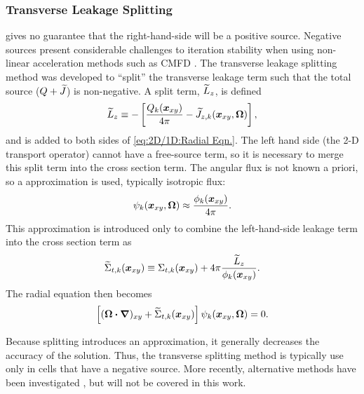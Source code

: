 {{{      \subsubsection{Transverse Leakage Splitting}{\label{sssec:3T:Transverse Leakage Splitting}
         gives no guarantee that the right-hand-side will be a positive source.
        Negative sources present considerable challenges to iteration stability when using non-linear acceleration methods such as \ac{CMFD} \cite{Jarrett2018}.
        The transverse leakage splitting method \cite{Stimpson2015,Kelley2015} was developed to ``split'' the transverse leakage term such that the total source ($Q+\widetilde{J}$) is non-negative.
        A split term, $\widetilde{L}_{z}$, is defined
        \begin{equation}\label{eq:2D/1D:Split Term}
          \widetilde{L}_z \equiv -\left[\frac{Q_k(\boldsymbol{x}_{xy})}{4\pi} - \widetilde{J}_{z,k}(\boldsymbol{x}_{xy},\boldsymbol{\Omega})\right],
        \end{equation}
        and is added to both sides of \cref{eq:2D/1D:Radial Eqn.}.
        The left hand side (the 2-D transport operator) cannot have a free-source term, so it is necessary to merge this split term into the cross section term.
        The angular flux is not known a priori, so a approximation is used, typically isotropic flux:
        \begin{equation}\label{eq:2D/1D:Isotropic Flux}
          \psi_k(\boldsymbol{x}_{xy},\boldsymbol{\Omega}) \approx \frac{\phi_k(\boldsymbol{x}_{xy})}{4\pi}.
        \end{equation}
        This approximation is introduced only to combine the left-hand-side leakage term into the cross section term as
        \begin{equation}\label{eq:2D/1D:Split XS}
          \mxst[t,k](\rloc) \defined \xst[t,k](\rloc) + \fourpi\frac{\L_z}{\phi_k(\rloc)}.
        \end{equation}
        The radial equation then becomes
        \begin{equation}\label{eq:2D/1D:Split Radial Eqn.}
          \left[(\dir\vdot\grad)_{xy} + \mxst[t,k](\rloc)\right]\aflux_k(\rloc,\dir) = 0.
        \end{equation}

        Because splitting introduces an approximation, it generally decreases the accuracy of the solution.
        Thus, the transverse splitting method is typically use only in cells that have a negative source.
        More recently, alternative methods have been investigated \cite{Zhao2018}, but will not be covered in this work.
      }
    }

}}
